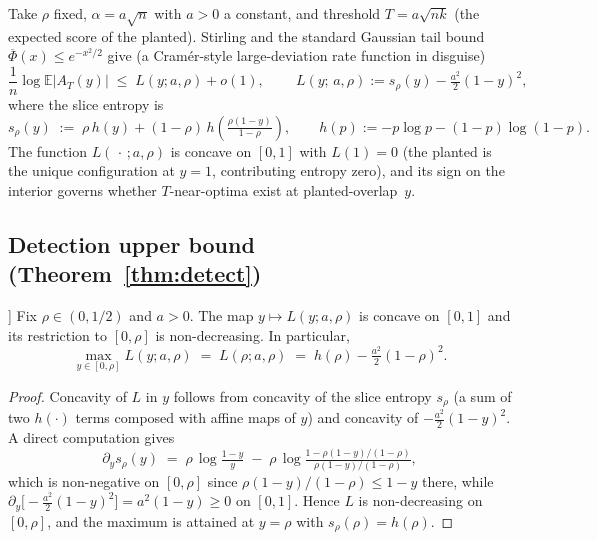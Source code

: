 Take $\rho$ fixed, $\alpha=a\sqrt n$ with $a>0$ a constant, and threshold $T = a\sqrt{nk}$
(the expected score of the planted). Stirling and the standard Gaussian tail bound
$\overline\Phi(x)\leq e^{-x^2/2}$ give (a Cram\'er-style large-deviation rate function \cite{cramer-original} in disguise)
\begin{equation}
\frac{1}{n}\log\mathbb E|A_T(y)| \;\leq\; L(y;a,\rho) + o(1),\qquad
\boxed{\ L(y;\,a,\rho) := s_\rho(y) - \tfrac{a^2}{2}(1-y)^2,\ }
\label{eq:Ldef}
\end{equation}
where the slice entropy is
\begin{equation}
s_\rho(y) \;:=\; \rho\,h(y) + (1-\rho)\,h\!\left(\tfrac{\rho(1-y)}{1-\rho}\right),
\qquad h(p) := -p\log p - (1-p)\log(1-p).
\label{eq:srho}
\end{equation}
The function $L(\,\cdot\,;a,\rho)$ is concave on $[0,1]$ with $L(1)=0$ (the planted is the
unique configuration at $y=1$, contributing entropy zero), and its sign on the interior
governs whether $T$-near-optima exist at planted-overlap~$y$.

\subsection{Detection upper bound (Theorem~\ref{thm:detect})}

\begin{lemma}[Endpoint maximum of \(L\) on \([0,\rho]\)]\label{lem:endpoint-max}
Fix $\rho\in(0,1/2)$ and $a>0$. The map $y\mapsto L(y;a,\rho)$ is concave on $[0,1]$
and its restriction to $[0,\rho]$ is non-decreasing. In particular,
\[
\max_{y\in[0,\rho]} L(y;a,\rho) \;=\; L(\rho;a,\rho) \;=\; h(\rho)-\tfrac{a^2}{2}(1-\rho)^2.
\]
\end{lemma}
\begin{proof}
Concavity of $L$ in $y$ follows from concavity of the slice entropy $s_\rho$
(a sum of two $h(\cdot)$ terms composed with affine maps of $y$) and concavity of
$-\tfrac{a^2}{2}(1-y)^2$. A direct computation gives
\[
\partial_y s_\rho(y) \;=\; \rho\,\log\!\tfrac{1-y}{y}
   \;-\;\rho\,\log\!\tfrac{1-\rho(1-y)/(1-\rho)}{\rho(1-y)/(1-\rho)},
\]
which is non-negative on $[0,\rho]$ since
$\rho(1-y)/(1-\rho)\le 1-y$ there, while
$\partial_y\bigl[-\tfrac{a^2}{2}(1-y)^2\bigr]=a^2(1-y)\ge 0$ on $[0,1]$. Hence $L$ is
non-decreasing on $[0,\rho]$, and the maximum is attained at $y=\rho$ with
$s_\rho(\rho)=h(\rho)$.
\end{proof}


